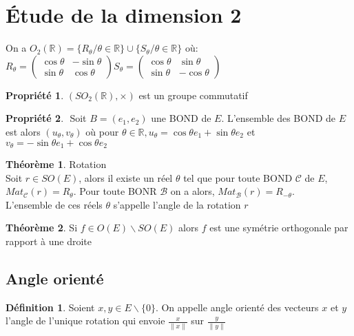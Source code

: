 \documentclass[fleqn]{article}
\theoremstyle{definition} \newtheorem*{defi}{D\'efinition}
\theoremstyle{definition} \newtheorem*{theo}{Th\'eor\`eme}
\theoremstyle{definition} \newtheorem*{coro}{Corollaire}
\theoremstyle{remark} \newtheorem*{rqs}{Remarques}
\theoremstyle{definition} \newtheorem*{prop}{Propri\'et\'e}
\begin{document}
\section{\'Etude de la dimension 2}

On a $O_2(\mathbb{R}) = \{R_{\theta} / \theta \in \mathbb{R}\} \cup \{S_\theta / \theta \in \mathbb{R}\}$ o\`u: \\
$R_\theta =
\begin{pmatrix}
	\cos \theta & -\sin \theta\\
	\sin \theta & \cos \theta
\end{pmatrix}
S_\theta =
\begin{pmatrix}
	\cos \theta & \sin \theta\\
	\sin \theta & -\cos \theta
\end{pmatrix}$

\begin{prop}
	$(SO_2(\mathbb{R}),\times)$ est un groupe commutatif
\end{prop}

\begin{prop} $ $
	Soit $B = (e_1, e_2)$ une BOND de $E$. L'ensemble des BOND de $E$ est alors $(u_\theta, v_\theta)$ o\`u pour $\theta \in \mathbb{R},
	u_\theta = \cos \theta e_1 + \sin \theta e_2$ et $v_\theta = -\sin \theta e_1 + \cos \theta e_2$
\end{prop}

\begin{theo} Rotation \\
	Soit $r \in SO(E)$, alors il existe un r\'eel $\theta$ tel que pour toute BOND $\mathscr{C}$ de $E$, $Mat_\mathscr{C}(r) = R_\theta$. Pour
	toute BONR $\mathscr{B}$ on a alors, $Mat_\mathscr{B}(r) = R_{-\theta}$. \\
	L'ensemble de ces r\'eels $\theta$ s'appelle l'angle de la rotation $r$
\end{theo}

\begin{theo}
	Si $f \in O(E) \backslash SO(E)$ alors $f$ est une sym\'etrie orthogonale par rapport \`a une droite
\end{theo}

\subsection{Angle orient\'e}

\begin{defi}
	Soient $x,y \in E\backslash \{0\}$. On appelle angle orient\'e des vecteurs $x$ et $y$ l'angle de l'unique rotation qui envoie
	$\frac{x}{\|x\|}$ sur $\frac{y}{\|y\|}$
\end{defi}
\end{document}
